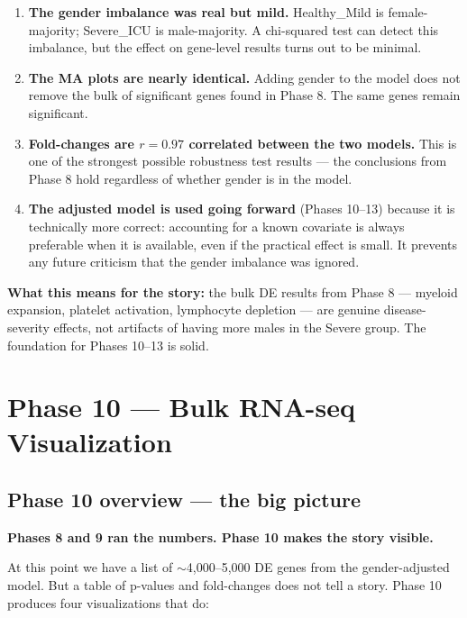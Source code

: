 \documentclass[11pt, a4paper]{article}
\begin{document}
\begin{enumerate}[nosep]
  \item \textbf{The gender imbalance was real but mild.}
        Healthy\_Mild is female-majority; Severe\_ICU is male-majority.
        A chi-squared test can detect this imbalance, but the effect on
        gene-level results turns out to be minimal.

  \item \textbf{The MA plots are nearly identical.}
        Adding gender to the model does not remove the bulk of significant
        genes found in Phase 8. The same genes remain significant.

  \item \textbf{Fold-changes are $r = 0.97$ correlated between the two models.}
        This is one of the strongest possible robustness test results —
        the conclusions from Phase 8 hold regardless of whether gender is
        in the model.

  \item \textbf{The adjusted model is used going forward} (Phases 10--13)
        because it is technically more correct: accounting for a known
        covariate is always preferable when it is available, even if
        the practical effect is small. It prevents any future criticism
        that the gender imbalance was ignored.
\end{enumerate}

\textbf{What this means for the story:} the bulk DE results from Phase 8 —
myeloid expansion, platelet activation, lymphocyte depletion — are genuine
disease-severity effects, not artifacts of having more males in the Severe
group. The foundation for Phases 10--13 is solid.

\section{Phase 10 — Bulk RNA-seq Visualization}

\subsection{Phase 10 overview — the big picture}

\textbf{Phases 8 and 9 ran the numbers. Phase 10 makes the story visible.}

At this point we have a list of $\sim$4,000--5,000 DE genes from the
gender-adjusted model. But a table of p-values and fold-changes does not
tell a story. Phase 10 produces four visualizations that do:
\end{document}
